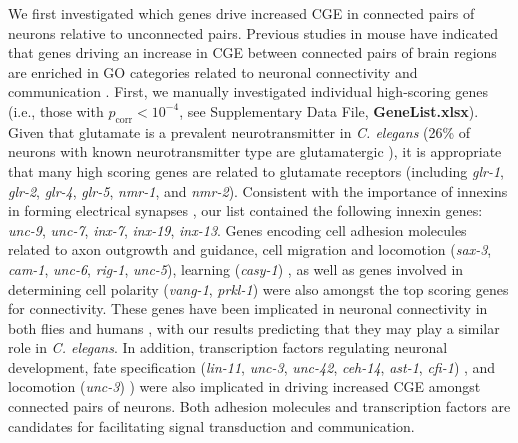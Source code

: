 \documentclass[10pt,letterpaper]{article}
\begin{document}
{We first investigated which genes drive increased CGE in connected pairs of neurons relative to unconnected pairs.
Previous studies in mouse have indicated that genes driving an increase in CGE between connected pairs of brain regions are enriched in GO categories related to neuronal connectivity and communication \cite{Fulcher:2016ck, Ji:2014jw, Fakhry:2015kl, French2011}.
First, we manually investigated individual high-scoring genes (i.e., those with $p_\mathrm{corr} < 10^{-4}$, see Supplementary Data File, \textbf{GeneList.xlsx}).
Given that glutamate is a prevalent neurotransmitter in \textit{C. elegans} (26\% of neurons with known neurotransmitter type are glutamatergic \cite{Pereira:2015er}), it is appropriate that many high scoring genes are related to glutamate receptors (including \emph{glr-1}, \emph{glr-2}, \emph{glr-4}, \emph{glr-5}, \emph{nmr-1}, and \emph{nmr-2}).
Consistent with the importance of innexins in forming electrical synapses \cite{Starich2001}, our list contained the following innexin genes: \emph{unc-9}, \emph{unc-7}, \emph{inx-7}, \emph{inx-19}, \emph{inx-13}.
Genes encoding cell adhesion molecules related to axon outgrowth and guidance, cell migration and locomotion (\emph{sax-3}, \emph{cam-1}, \emph{unc-6}, \emph{rig-1}, \emph{unc-5}), learning (\emph{casy-1}) \cite{Zallen1999, Garriga1999, Leung-Hagesteijn1992, Harris:2009kd, Ikeda2008},
as well as genes involved in determining cell polarity (\emph{vang-1}, \emph{prkl-1}) \cite{Wu2006, Hoffmann2010} were also amongst the top scoring genes for connectivity.
These genes have been implicated in neuronal connectivity in both flies and humans \cite{Paemka2013, Ehaideb2016, Sowers2013}, with our results predicting that they may play a similar role in \textit{C. elegans}.
In addition, transcription factors regulating neuronal development,
fate specification (\emph{lin-11}, \emph{unc-3}, \emph{unc-42}, \emph{ceh-14}, \emph{ast-1}, \emph{cfi-1}) \cite{Sarafi-Reinach2001, Prasad2008, Baran1999, Cassata2000, Schmid2006, Shaham2002a},
and locomotion (\emph{unc-3}) \cite{Prasad2008}) were also implicated in driving increased CGE amongst connected pairs of neurons.
Both adhesion molecules and transcription factors are candidates for facilitating signal transduction and communication.

}
\end{document}

